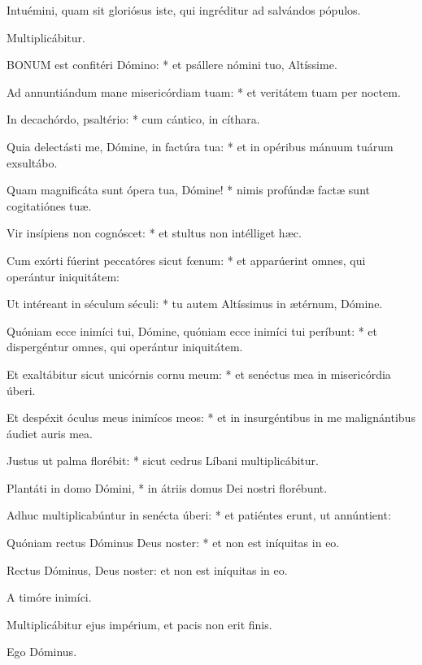 
 Intuémini, quam sit gloriósus iste, qui ingréditur ad salvándos pópulos.

 Multiplicábitur.


\lettrine[lines=2]{B}{ONUM} est confitéri Dómino: * et psállere nómini tuo, Altíssime.

Ad annuntiándum mane misericórdiam tuam: * et veritátem tuam per noctem.

In decachórdo, psaltério: * cum cántico, in cíthara.

Quia delectásti me, Dómine, in factúra tua: * et in opéribus mánuum tuárum exsultábo.

Quam magnificáta sunt ópera tua, Dómine! * nimis profúndæ factæ sunt cogitatiónes tuæ.

Vir insípiens non cognóscet: * et stultus non intélliget hæc.

Cum exórti fúerint peccatóres sicut fœnum: * et apparúerint omnes, qui operántur iniquitátem:

Ut intéreant in séculum séculi: * tu autem Altíssimus in ætérnum, Dómine.

Quóniam ecce inimíci tui, Dómine, quóniam ecce inimíci tui períbunt: * et dispergéntur omnes, qui operántur iniquitátem.

Et exaltábitur sicut unicórnis cornu meum: * et senéctus mea in misericórdia úberi.

Et despéxit óculus meus inimícos meos: * et in insurgéntibus in me malignántibus áudiet auris mea.

Justus ut palma florébit: * sicut cedrus Líbani multiplicábitur.

Plantáti in domo Dómini, * in átriis domus Dei nostri florébunt.

Adhuc multiplicabúntur in senécta úberi: * et patiéntes erunt, ut annúntient:

Quóniam rectus Dóminus Deus noster: * et non est iníquitas in eo.

 Rectus Dóminus, Deus noster: et non est iníquitas in eo.

 A timóre inimíci.


 Multiplicábitur ejus impérium, et pacis non erit finis.

 Ego Dóminus.

